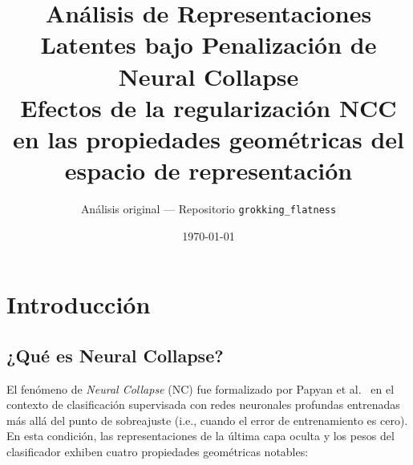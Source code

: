 \documentclass[12pt,a4paper]{report}
\title{\textbf{Análisis de Representaciones Latentes bajo Penalización de Neural Collapse\\
\large Efectos de la regularización NCC en las propiedades geométricas del espacio de representación}
}
\author{Análisis original --- Repositorio \texttt{grokking\_flatness}}
\date{\today}
\begin{document}
\maketitle
\tableofcontents
\newpage

\chapter{Introducción}

\section{¿Qué es Neural Collapse?}

El fenómeno de \emph{Neural Collapse} (NC) fue formalizado por Papyan et al.~\cite{papyan2020prevalence} en el contexto de clasificación supervisada con redes neuronales profundas entrenadas más allá del punto de sobreajuste (i.e., cuando el error de entrenamiento es cero). En esta condición, las representaciones de la última capa oculta y los pesos del clasificador exhiben cuatro propiedades geométricas notables:
\end{document}
